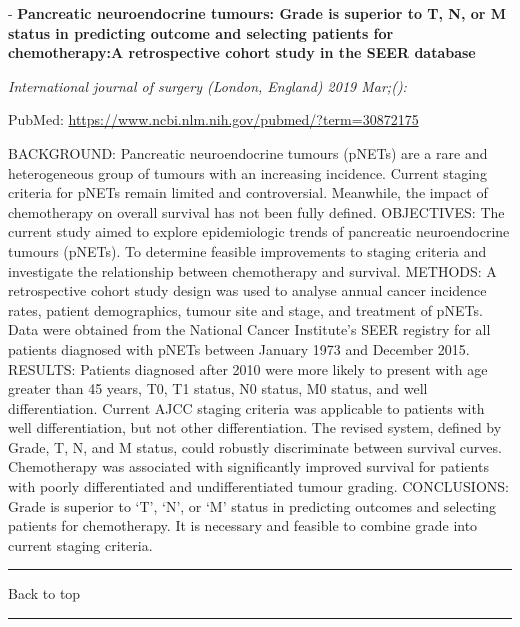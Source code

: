 \documentclass[]{article}
\begin{document}
 - \textbf{Pancreatic neuroendocrine tumours: Grade is superior to T, N,
or M status in predicting outcome and selecting patients for
chemotherapy:A retrospective cohort study in the SEER database}

\emph{International journal of surgery (London, England) 2019 Mar;():}

PubMed: \url{https://www.ncbi.nlm.nih.gov/pubmed/?term=30872175}

BACKGROUND: Pancreatic neuroendocrine tumours (pNETs) are a rare and
heterogeneous group of tumours with an increasing incidence. Current
staging criteria for pNETs remain limited and controversial. Meanwhile,
the impact of chemotherapy on overall survival has not been fully
defined. OBJECTIVES: The current study aimed to explore epidemiologic
trends of pancreatic neuroendocrine tumours (pNETs). To determine
feasible improvements to staging criteria and investigate the
relationship between chemotherapy and survival. METHODS: A retrospective
cohort study design was used to analyse annual cancer incidence rates,
patient demographics, tumour site and stage, and treatment of pNETs.
Data were obtained from the National Cancer Institute's SEER registry
for all patients diagnosed with pNETs between January 1973 and December
2015. RESULTS: Patients diagnosed after 2010 were more likely to present
with age greater than 45 years, T0, T1 status, N0 status, M0 status, and
well differentiation. Current AJCC staging criteria was applicable to
patients with well differentiation, but not other differentiation. The
revised system, defined by Grade, T, N, and M status, could robustly
discriminate between survival curves. Chemotherapy was associated with
significantly improved survival for patients with poorly differentiated
and undifferentiated tumour grading. CONCLUSIONS: Grade is superior to
`T', `N', or `M' status in predicting outcomes and selecting patients
for chemotherapy. It is necessary and feasible to combine grade into
current staging criteria.

{}

{}

\begin{center}\rule{0.5\linewidth}{\linethickness}\end{center}

Back to top

\begin{center}\rule{0.5\linewidth}{\linethickness}\end{center}

\pagebreak
\end{document}
